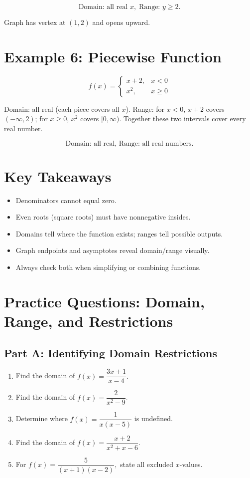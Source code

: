 \documentclass[14pt]{extarticle}
\begin{document}
\[
\boxed{\text{Domain: all real } x, \; \text{Range: } y \ge 2.}
\]

Graph has vertex at \((1, 2)\) and opens upward.

\section*{Example 6: Piecewise Function}

\[
f(x) =
\begin{cases}
x + 2, & x < 0 \\
x^2, & x \ge 0
\end{cases}
\]

Domain: all real (each piece covers all \(x\)).
Range: for \(x < 0\), \(x+2\) covers \((-\infty, 2)\); for \(x \ge 0\), \(x^2\) covers \([0, \infty)\). Together these two intervals cover every real number.

\[
\boxed{\text{Domain: all real, Range: all real numbers.}}
\]

\section*{Key Takeaways}
\begin{itemize}
  \item Denominators cannot equal zero.
  \item Even roots (square roots) must have nonnegative insides.
  \item Domains tell where the function exists; ranges tell possible outputs.
  \item Graph endpoints and asymptotes reveal domain/range visually.
  \item Always check both when simplifying or combining functions.
\end{itemize}

\newpage


\section*{Practice Questions: Domain, Range, and Restrictions}

\subsection*{Part A: Identifying Domain Restrictions}
\begin{enumerate}
  \item Find the domain of \(f(x) = \dfrac{3x + 1}{x - 4}.\)
  \item Find the domain of \(f(x) = \dfrac{2}{x^2 - 9}.\)
  \item Determine where \(f(x) = \dfrac{1}{x(x - 5)}\) is undefined.
  \item Find the domain of \(f(x) = \dfrac{x + 2}{x^2 + x - 6}.\)
  \item For \(f(x) = \dfrac{5}{(x + 1)(x - 2)},\) state all excluded \(x\)-values.
\end{enumerate}
\end{document}
